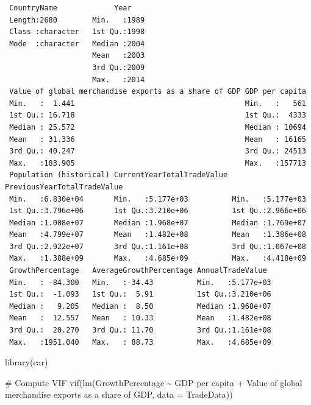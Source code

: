 \documentclass[
  10pt,
]{article}
\newenvironment{Shaded}{\begin{snugshade}}{\end{snugshade}}
\newcommand{\AttributeTok}[1]{\textcolor[rgb]{0.40,0.45,0.13}{#1}}
\newcommand{\CommentTok}[1]{\textcolor[rgb]{0.37,0.37,0.37}{#1}}
\newcommand{\FunctionTok}[1]{\textcolor[rgb]{0.28,0.35,0.67}{#1}}
\newcommand{\NormalTok}[1]{\textcolor[rgb]{0.00,0.23,0.31}{#1}}
\newcommand{\SpecialCharTok}[1]{\textcolor[rgb]{0.37,0.37,0.37}{#1}}
\newcommand{\StringTok}[1]{\textcolor[rgb]{0.13,0.47,0.30}{#1}}
\begin{document}
\begin{verbatim}
 CountryName             Year     
 Length:2680        Min.   :1989  
 Class :character   1st Qu.:1998  
 Mode  :character   Median :2004  
                    Mean   :2003  
                    3rd Qu.:2009  
                    Max.   :2014  
 Value of global merchandise exports as a share of GDP GDP per capita  
 Min.   :  1.441                                       Min.   :   561  
 1st Qu.: 16.718                                       1st Qu.:  4333  
 Median : 25.572                                       Median : 10694  
 Mean   : 31.336                                       Mean   : 16165  
 3rd Qu.: 40.247                                       3rd Qu.: 24513  
 Max.   :183.905                                       Max.   :157713  
 Population (historical) CurrentYearTotalTradeValue PreviousYearTotalTradeValue
 Min.   :6.830e+04       Min.   :5.177e+03          Min.   :5.177e+03          
 1st Qu.:3.796e+06       1st Qu.:3.210e+06          1st Qu.:2.966e+06          
 Median :1.008e+07       Median :1.968e+07          Median :1.769e+07          
 Mean   :4.799e+07       Mean   :1.482e+08          Mean   :1.386e+08          
 3rd Qu.:2.922e+07       3rd Qu.:1.161e+08          3rd Qu.:1.067e+08          
 Max.   :1.388e+09       Max.   :4.685e+09          Max.   :4.418e+09          
 GrowthPercentage   AverageGrowthPercentage AnnualTradeValue   
 Min.   : -84.300   Min.   :-34.43          Min.   :5.177e+03  
 1st Qu.:  -1.093   1st Qu.:  5.91          1st Qu.:3.210e+06  
 Median :   9.205   Median :  8.50          Median :1.968e+07  
 Mean   :  12.557   Mean   : 10.33          Mean   :1.482e+08  
 3rd Qu.:  20.270   3rd Qu.: 11.70          3rd Qu.:1.161e+08  
 Max.   :1951.040   Max.   : 88.73          Max.   :4.685e+09  
\end{verbatim}

\begin{Shaded}
\begin{Highlighting}[]
\FunctionTok{library}\NormalTok{(car) }

\CommentTok{\# Compute VIF}
\FunctionTok{vif}\NormalTok{(}\FunctionTok{lm}\NormalTok{(GrowthPercentage }\SpecialCharTok{\textasciitilde{}} \StringTok{\textasciigrave{}}\AttributeTok{GDP per capita}\StringTok{\textasciigrave{}} \SpecialCharTok{+} \StringTok{\textasciigrave{}}\AttributeTok{Value of global merchandise exports as a share of GDP}\StringTok{\textasciigrave{}}\NormalTok{, }\AttributeTok{data =}\NormalTok{ TradeData))}
\end{Highlighting}
\end{Shaded}
\end{document}
